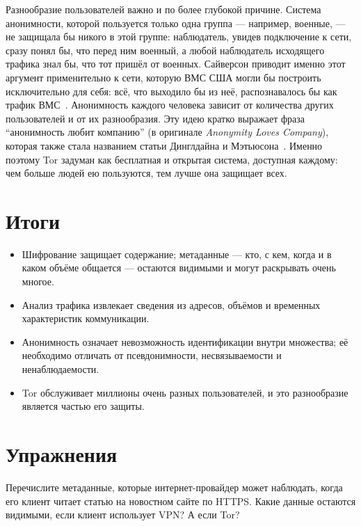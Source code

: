 Разнообразие пользователей важно и по более глубокой причине. Система анонимности, которой пользуется только одна группа --- например, военные, --- не защищала бы никого в этой группе: наблюдатель, увидев подключение к сети, сразу понял бы, что перед ним военный, а любой наблюдатель исходящего трафика знал бы, что тот пришёл от военных. Сайверсон приводит именно этот аргумент применительно к сети, которую ВМС США могли бы построить исключительно для себя: всё, что выходило бы из неё, распознавалось бы как трафик ВМС~\cite{syverson2011peel}. Анонимность каждого человека зависит от количества других пользователей и от их разнообразия. Эту идею кратко выражает фраза \enquote{анонимность любит компанию} (в оригинале \emph{Anonymity Loves Company}), которая также стала названием статьи Динглдайна и Мэтьюсона~\cite{dingledine2006company}. Именно поэтому Tor задуман как бесплатная и открытая система, доступная каждому: чем больше людей ею пользуются, тем лучше она защищает всех.

\section*{Итоги}
\begin{itemize}
  \item Шифрование защищает содержание; метаданные --- кто, с кем, когда и в каком объёме общается --- остаются видимыми и могут раскрывать очень многое.
  \item Анализ трафика извлекает сведения из адресов, объёмов и временных характеристик коммуникации.
  \item Анонимность означает невозможность идентификации внутри множества; её необходимо отличать от псевдонимности, несвязываемости и ненаблюдаемости.
  \item Tor обслуживает миллионы очень разных пользователей, и это разнообразие является частью его защиты.
\end{itemize}

\section*{Упражнения}

\begin{esercizio}[1]\label{es:01-metadati}
Перечислите метаданные, которые интернет-провайдер может наблюдать, когда его клиент читает статью на новостном сайте по HTTPS. Какие данные остаются видимыми, если клиент использует VPN? А если Tor?
\end{esercizio}

